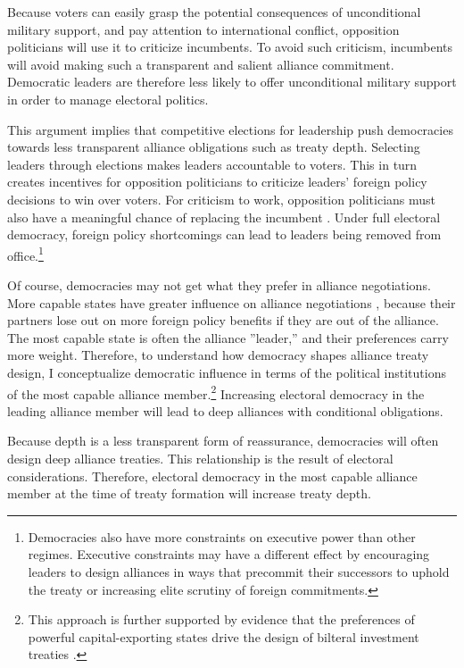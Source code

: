 \documentclass[12pt]{article}
\begin{document}
Because voters can easily grasp the potential consequences of unconditional military support, and pay attention to international conflict, opposition politicians will use it to criticize incumbents. 
To avoid such criticism, incumbents will avoid making such a transparent and salient alliance commitment.
Democratic leaders are therefore less likely to offer unconditional military support in order to manage electoral politics. 


This argument implies that competitive elections for leadership push democracies towards less transparent alliance obligations such as treaty depth.
Selecting leaders through elections makes leaders accountable to voters. 
This in turn creates incentives for opposition politicians to criticize leaders' foreign policy decisions to win over voters. 
For criticism to work, opposition politicians must also have a meaningful chance of replacing the incumbent \citep{HydeMarinov2012}.
Under full electoral democracy, foreign policy shortcomings can lead to leaders being removed from office.\footnote{Democracies also have more constraints on executive power than other regimes. Executive constraints may have a different effect by encouraging leaders to design alliances in ways that precommit their successors to uphold the treaty or increasing elite scrutiny of foreign commitments.} 


Of course, democracies may not get what they prefer in alliance negotiations. 
More capable states have greater influence on alliance negotiations \citep{Mattes2012}, because their partners lose out on more foreign policy benefits if they are out of the alliance.
The most capable state is often the alliance ''leader,'' and their preferences carry more weight. 
Therefore, to understand how democracy shapes alliance treaty design, I conceptualize democratic influence in terms of the political institutions of the most capable alliance member.\footnote{This approach is further supported by evidence that the preferences of powerful capital-exporting states drive the design of bilteral investment treaties \citep{AlleePeinhardt2014}.} 
Increasing electoral democracy in the leading alliance member will lead to deep alliances with conditional obligations. 


Because depth is a less transparent form of reassurance, democracies will often design deep alliance treaties. 
This relationship is the result of electoral considerations. 
Therefore, electoral democracy in the most capable alliance member at the time of treaty formation will increase treaty depth. 
\end{document}
